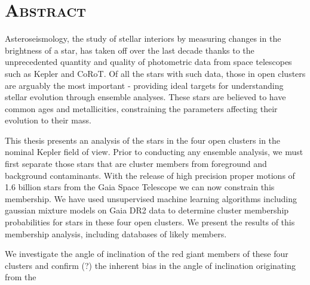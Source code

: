 \chapter*{\textsc{Abstract}}

\vspace{1.5cm}

Asteroseismology, the study of stellar interiors by measuring changes in the brightness of a star, has taken off over the last decade thanks to the unprecedented quantity and quality of photometric data from space telescopes such as Kepler and CoRoT. Of all the stars with such data, those in open clusters are arguably the most important - providing ideal targets for understanding stellar evolution through ensemble analyses. These stars are believed to have common ages and metallicities, constraining the parameters affecting their evolution to their mass. 

This thesis presents an analysis of the stars in the four open clusters in the nominal Kepler field of view. Prior to conducting any ensemble analysis, we must first separate those stars that are cluster members from foreground and background contaminants. With the release of high precision proper motions of 1.6 billion stars from the Gaia Space Telescope we can now constrain this membership. We have used unsupervised machine learning algorithms including gaussian mixture models on Gaia DR2 data to determine cluster membership probabilities for stars in these four open clusters. We present the results of this membership analysis, including databases of likely members. 

We investigate the angle of inclination of the red giant members of these four clusters and confirm (?) \cite{corsaro_spin_2017} the inherent bias in the angle of inclination originating from the 
